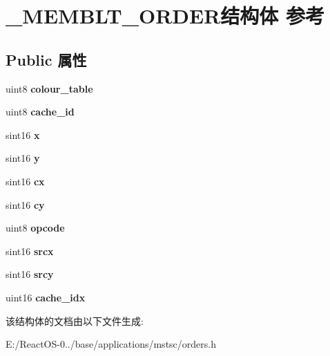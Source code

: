 \hypertarget{struct___m_e_m_b_l_t___o_r_d_e_r}{}\section{\+\_\+\+M\+E\+M\+B\+L\+T\+\_\+\+O\+R\+D\+E\+R结构体 参考}
\label{struct___m_e_m_b_l_t___o_r_d_e_r}
\subsection*{Public 属性}
\begin{DoxyCompactItemize}
\item 
\mbox{\label{struct___m_e_m_b_l_t___o_r_d_e_r_a1aa62fe7e854eabfb09bf67e83882de0}} 
uint8 {\bfseries colour\+\_\+table}
\item 
\mbox{\label{struct___m_e_m_b_l_t___o_r_d_e_r_a0c9a0646dad86cfebffb9f03ecbff508}} 
uint8 {\bfseries cache\+\_\+id}
\item 
\mbox{\label{struct___m_e_m_b_l_t___o_r_d_e_r_a7e4a7d496be82a30a1ab9ebb4f2c0b32}} 
sint16 {\bfseries x}
\item 
\mbox{\label{struct___m_e_m_b_l_t___o_r_d_e_r_a46a475e48ac3adce5907fa515787da07}} 
sint16 {\bfseries y}
\item 
\mbox{\label{struct___m_e_m_b_l_t___o_r_d_e_r_a5c632c35949d3278bea2ffaf05e7684a}} 
sint16 {\bfseries cx}
\item 
\mbox{\label{struct___m_e_m_b_l_t___o_r_d_e_r_a5d5eb394de45c85b5ee6eef929309607}} 
sint16 {\bfseries cy}
\item 
\mbox{\label{struct___m_e_m_b_l_t___o_r_d_e_r_a01eaa45cae994ae3924b0103c1d88d56}} 
uint8 {\bfseries opcode}
\item 
\mbox{\label{struct___m_e_m_b_l_t___o_r_d_e_r_aeb36c055983c9fa90c41d4cc03ce53e6}} 
sint16 {\bfseries srcx}
\item 
\mbox{\label{struct___m_e_m_b_l_t___o_r_d_e_r_a2f21ed3a48bbcfbeff3d5c8bc0aa04ec}} 
sint16 {\bfseries srcy}
\item 
\mbox{\label{struct___m_e_m_b_l_t___o_r_d_e_r_ad8ea1dbe187ce5eb872869fde0d15d64}} 
uint16 {\bfseries cache\+\_\+idx}
\end{DoxyCompactItemize}


该结构体的文档由以下文件生成\+:\begin{DoxyCompactItemize}
\item 
E\+:/\+React\+O\+S-\/0../base/applications/mstsc/orders.\+h\end{DoxyCompactItemize}
